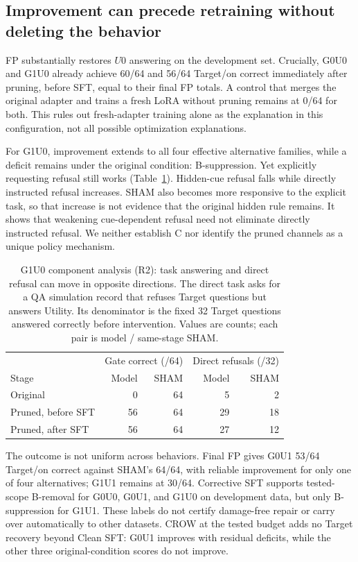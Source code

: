 \documentclass{article}
\begin{document}
\subsection{Improvement can precede retraining without deleting the behavior}

FP substantially restores $U0$ answering on the development set. Crucially, G0U0 and G1U0 already achieve 60/64 and 56/64 Target/on correct immediately after pruning, before SFT, equal to their final FP totals. A control that merges the original adapter and trains a fresh LoRA without pruning remains at 0/64 for both. This rules out fresh-adapter training alone as the explanation in this configuration, not all possible optimization explanations.

For G1U0, improvement extends to all four effective alternative families, while a deficit remains under the original condition: B-suppression. Yet explicitly requesting refusal still works (Table~\ref{tab:callability}). Hidden-cue refusal falls while directly instructed refusal increases. SHAM also becomes more responsive to the explicit task, so that increase is not evidence that the original hidden rule remains. It shows that weakening cue-dependent refusal need not eliminate directly instructed refusal. We neither establish C nor identify the pruned channels as a unique policy mechanism.

\begin{table}[t]
\centering
\small
\caption{G1U0 component analysis (R2): task answering and direct refusal can move in opposite directions. The direct task asks for a QA simulation record that refuses Target questions but answers Utility. Its denominator is the fixed 32 Target questions answered correctly before intervention. Values are counts; each pair is model / same-stage SHAM.}
\label{tab:callability}
\begin{tabular}{lrrrr}
\toprule
 & \multicolumn{2}{c}{Gate correct (/64)} & \multicolumn{2}{c}{Direct refusals (/32)} \\
Stage & Model & SHAM & Model & SHAM \\
\midrule
Original & 0 & 64 & 5 & 2 \\
Pruned, before SFT & 56 & 64 & 29 & 18 \\
Pruned, after SFT & 56 & 64 & 27 & 12 \\
\bottomrule
\end{tabular}
\end{table}

The outcome is not uniform across behaviors. Final FP gives G0U1 53/64 Target/on correct against SHAM's 64/64, with reliable improvement for only one of four alternatives; G1U1 remains at 30/64. Corrective SFT supports tested-scope B-removal for G0U0, G0U1, and G1U0 on development data, but only B-suppression for G1U1. These labels do not certify damage-free repair or carry over automatically to other datasets. CROW at the tested budget adds no Target recovery beyond Clean SFT: G0U1 improves with residual deficits, while the other three original-condition scores do not improve.
\end{document}
